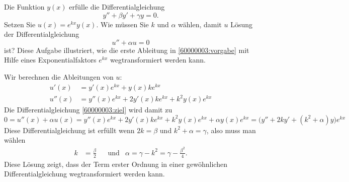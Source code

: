 Die Funktion $y(x)$ erfülle die Differentialgleichung
\begin{equation}
y''+\beta y' + \gamma y=0.
\label{60000003:vorgabe}
\end{equation}
Setzen Sie $u(x)=e^{k x}y(x)$.
Wie müssen Sie $k$ und $\alpha$ wählen, damit $u$ Lösung der
Differentialgleichung
\begin{equation}
u''+\alpha u=0
\label{60000003:ziel}
\end{equation}
ist?
Diese Aufgabe illustriert, wie die erste Ableitung in
\eqref{60000003:vorgabe} mit Hilfe eines Exponentialfaktors $e^{kx}$
wegtransformiert werden kann.

\begin{loesung}
Wir berechnen die Ableitungen von $u$:
\begin{align*}
u'(x)&=y'(x)e^{kx}+y(x)ke^{kx}\\
u''(x)&=y''(x)e^{kx}+2y'(x)ke^{kx}+k^2y(x)e^{kx}
\end{align*}
Die Differentialgleichung  \eqref{60000003:ziel} wird damit
zu
\[
0
=
u''(x)+\alpha u(x)
=
y''(x)e^{kx}+2y'(x)ke^{kx}+k^2y(x)e^{kx}
+ \alpha y(x)e^{kx}
=
\bigl(
y''+2k y' +(k^2+\alpha)y
\bigr)
e^{kx}
\]
Diese Differentialgleichung ist erfüllt wenn $2k=\beta$ und
$k^2+\alpha=\gamma$, also muss man wählen
\[
\begin{aligned}
k&=\frac{\beta}2
&
&\text{und}&
\alpha=\gamma-k^2=\gamma-\frac{\beta^2}4.
\end{aligned}
\]
Diese Lösung zeigt, dass der Term erster Ordnung in einer gewöhnlichen
Differentialgleichung wegtransformiert werden kann.
\end{loesung}

